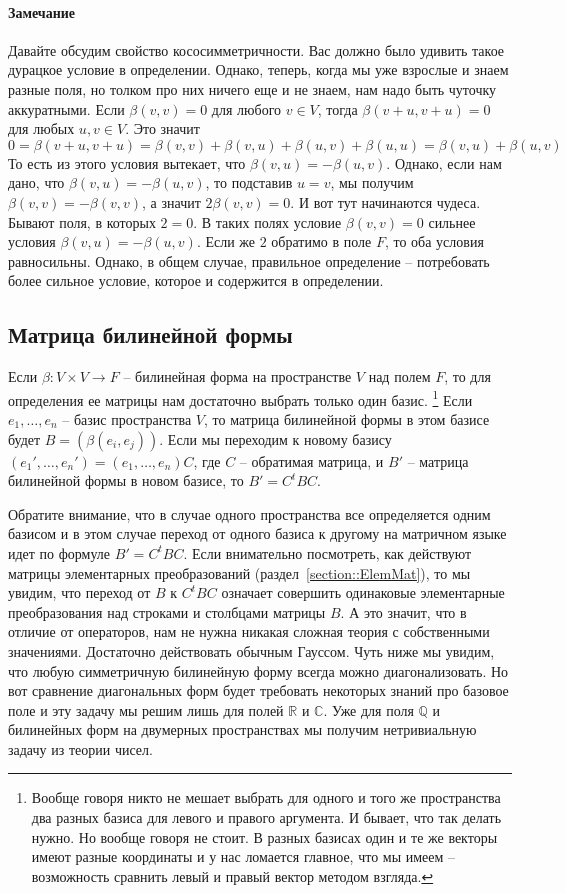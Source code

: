 \paragraph{Замечание}
Давайте обсудим свойство кососимметричности.
Вас должно было удивить такое дурацкое условие в определении.
Однако, теперь, когда мы уже взрослые и знаем разные поля, но толком про них ничего еще и не знаем, нам надо быть чуточку аккуратными.
Если $\beta(v,v) = 0$ для любого $v\in V$, тогда $\beta(v+u,v+u) = 0$ для любых $u,v\in V$.
Это значит
\[
0=\beta(v+u,v+u) = \beta(v,v) + \beta(v,u) + \beta(u,v)+\beta(u,u) = \beta(v,u) + \beta(u,v)
\]
То есть из этого условия вытекает, что $\beta(v,u) = -\beta(u,v)$.
Однако, если нам дано, что $\beta(v,u) = -\beta(u,v)$, то подставив $u = v$, мы получим $\beta(v,v) = -\beta(v,v)$, а значит $2\beta(v,v) = 0$.
И вот тут начинаются чудеса.
Бывают поля, в которых $2 = 0$.
В таких полях условие $\beta(v,v) = 0$ сильнее условия $\beta(v,u) = -\beta(u,v)$.
Если же $2$ обратимо в поле $F$, то оба условия равносильны.
Однако, в общем случае, правильное определение -- потребовать более сильное условие, которое и содержится в определении.


\subsection{Матрица билинейной формы}

Если $\beta\colon V\times V\to F$ -- билинейная форма на пространстве $V$ над полем $F$, то для определения ее матрицы нам достаточно выбрать только один базис.%
\footnote{Вообще говоря никто не мешает выбрать для одного и того же пространства два разных базиса для левого и правого аргумента.
И бывает, что так делать нужно.
Но вообще говоря не стоит.
В разных базисах один и те же векторы имеют разные координаты и у нас ломается главное, что мы имеем -- возможность сравнить левый и правый вектор методом взгляда.}
Если $e_1,\ldots,e_n$ -- базис пространства $V$, то матрица билинейной формы в этом базисе будет $B = (\beta(e_i, e_j))$.
Если мы переходим к новому базису $(e_1',\ldots,e_n') = (e_1,\ldots,e_n) C$, где $C$ -- обратимая матрица, и $B'$ -- матрица билинейной формы в новом базисе, то $B' = C^t B C$.

Обратите внимание, что в случае одного пространства все определяется одним базисом и в этом случае переход от одного базиса к другому на матричном языке идет по формуле $B' = C^t B C$.
Если внимательно посмотреть, как действуют матрицы элементарных преобразований (раздел~\ref{section::ElemMat}), то мы увидим, что переход от $B$ к $C^tBC$ означает совершить одинаковые элементарные преобразования над строками и столбцами матрицы $B$.
А это значит, что в отличие от операторов, нам не нужна никакая сложная теория с собственными значениями.
Достаточно действовать обычным Гауссом.
Чуть ниже мы увидим, что любую симметричную билинейную форму всегда можно диагонализовать.
Но вот сравнение диагональных форм будет требовать некоторых знаний про базовое поле и эту задачу мы решим лишь для полей $\mathbb R$ и $\mathbb C$.
Уже для поля $\mathbb Q$ и билинейных форм на двумерных пространствах мы получим нетривиальную задачу из теории чисел.

